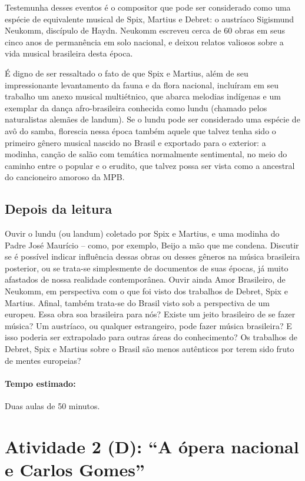 \documentclass[11pt]{extarticle}
\begin{document}
Testemunha desses eventos é o compositor que pode ser considerado como uma
espécie de equivalente musical de Spix, Martius e Debret: o austríaco Sigismund
Neukomm, discípulo de Haydn. Neukomm escreveu cerca de 60 obras em seus cinco
anos de permanência em solo nacional, e deixou relatos valiosos sobre a vida
musical brasileira desta época.

É digno de ser ressaltado o fato de que Spix e Martius, além de seu
impressionante levantamento da fauna e da flora nacional, incluíram em seu
trabalho um anexo musical multiétnico, que abarca melodias indígenas e um
exemplar da dança afro-brasileira conhecida como lundu (chamado pelos
naturalistas alemães de landum). Se o lundu pode ser considerado uma espécie de
avô do samba, florescia nessa época também aquele que talvez tenha sido o
primeiro gênero musical nascido no Brasil e exportado para o exterior: a
modinha, canção de salão com temática normalmente sentimental, no meio do
caminho entre o popular e o erudito, que talvez possa ser vista como a
ancestral do cancioneiro amoroso da MPB.

\subsection{Depois da leitura}

Ouvir o lundu (ou landum) coletado por Spix e Martius, e uma modinha do Padre
José Maurício – como, por exemplo, Beijo a mão que me condena. Discutir se é
possível indicar influência dessas obras ou desses gêneros na música brasileira
posterior, ou se trata-se simplesmente de documentos de suas épocas, já muito
afastados de nossa realidade contemporânea. Ouvir ainda Amor Brasileiro, de
Neukomm, em perspectiva com o que foi visto dos trabalhos de Debret, Spix e
Martius. Afinal, também trata-se do Brasil visto sob a perspectiva de um
europeu. Essa obra soa brasileira para nós? Existe um jeito brasileiro de se
fazer música? Um austríaco, ou qualquer estrangeiro, pode fazer música
brasileira? E isso poderia ser extrapolado para outras áreas do conhecimento?
Os trabalhos de Debret, Spix e Martius sobre o Brasil são menos autênticos por
terem sido fruto de mentes europeias?

\paragraph{Tempo estimado:} Duas aulas de 50 minutos. 

 
\section{Atividade 2 (D): “A ópera nacional e Carlos Gomes”}
\end{document}
